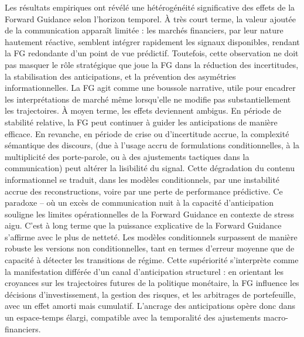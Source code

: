 Les résultats empiriques ont révélé une hétérogénéité significative des effets de la Forward Guidance selon l’horizon temporel. À très court terme, la valeur ajoutée de la communication apparaît limitée : les marchés financiers, par leur nature hautement réactive, semblent intégrer rapidement les signaux disponibles, rendant la FG redondante d’un point de vue prédictif. Toutefois, cette observation ne doit pas masquer le rôle stratégique que joue la FG dans la réduction des incertitudes, la stabilisation des anticipations, et la prévention des asymétries informationnelles. La FG agit comme une boussole narrative, utile pour encadrer les interprétations de marché même lorsqu’elle ne modifie pas substantiellement les trajectoires. À moyen terme, les effets deviennent ambigus. En période de stabilité relative, la FG peut continuer à guider les anticipations de manière efficace. En revanche, en période de crise ou d’incertitude accrue, la complexité sémantique des discours, (due à l’usage accru de formulations conditionnelles, à la multiplicité des porte-parole, ou à des ajustements tactiques dans la communication) peut altérer la lisibilité du signal. Cette dégradation du contenu informationnel se traduit, dans les modèles conditionnels, par une instabilité accrue des reconstructions, voire par une perte de performance prédictive. Ce paradoxe – où un excès de communication nuit à la capacité d’anticipation souligne les limites opérationnelles de la Forward Guidance en contexte de stress aigu. C’est à long terme que la puissance explicative de la Forward Guidance s’affirme avec le plus de netteté. Les modèles conditionnels surpassent de manière robuste les versions non conditionnelles, tant en termes d’erreur moyenne que de capacité à détecter les transitions de régime. Cette supériorité s’interprète comme la manifestation différée d’un canal d’anticipation structurel : en orientant les croyances sur les trajectoires futures de la politique monétaire, la FG influence les décisions d’investissement, la gestion des risques, et les arbitrages de portefeuille, avec un effet amorti mais cumulatif. L’ancrage des anticipations opère donc dans un espace-temps élargi, compatible avec la temporalité des ajustements macro-financiers.\\

